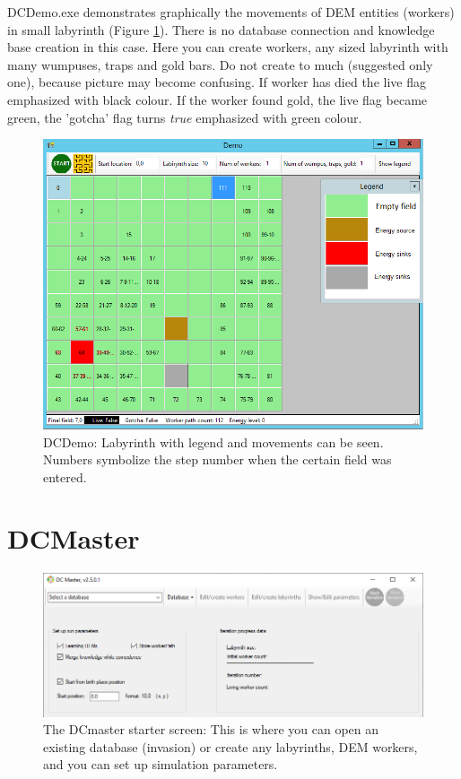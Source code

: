 \documentclass[a4paper,12pt]{article}
\begin{document}
DCDemo.exe  demonstrates graphically the movements of DEM entities (workers) in small labyrinth (Figure \ref{fig:demo}). There is no database connection and knowledge base creation in this case. Here you can create workers, any sized labyrinth with many wumpuses, traps and gold bars. Do not create to much (suggested only one), because picture may become confusing.
If worker has died the live flag emphasized with black colour. If the worker found gold, the live flag became green, the 'gotcha' flag turns \textit{true} emphasized with green colour.

\begin{figure}
\centering
	\includegraphics[width=14cm]{demo.png}
	\caption{DCDemo: Labyrinth with legend and movements can be seen. Numbers symbolize the step number when the certain field was entered.}
	\label{fig:demo}
\end{figure}




\section{DCMaster}

\begin{figure}
	\begin{center}
		\includegraphics[width=15cm]{master1.png}
		\caption{The DCmaster starter screen: This is where you can open an existing database (invasion) or create any labyrinths, DEM workers, and you can set up simulation parameters. }
		\label{fig:master1}
	\end{center}
\end{figure}
\end{document}
